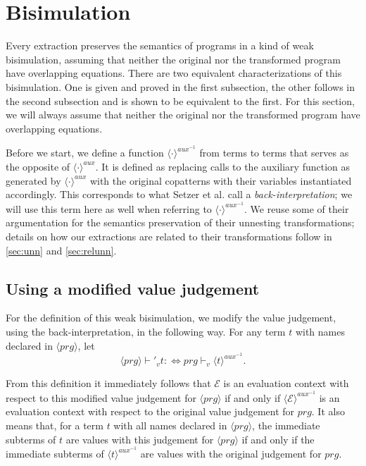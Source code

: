 \section{Bisimulation}
\label{sec:extrbis}

Every extraction preserves the semantics of programs in a kind of weak bisimulation, assuming that neither the original nor the transformed program have overlapping equations. There are two equivalent characterizations of this bisimulation. One is given and proved in the first subsection, the other follows in the second subsection and is shown to be equivalent to the first. For this section, we will always assume that neither the original nor the transformed program have overlapping equations.

Before we start, we define a function $\langle \cdot \rangle^{aux^{-1}}$ from terms to terms that serves as the opposite of $\langle \cdot \rangle^{aux}$. It is defined as replacing calls to the auxiliary function as generated by $\langle \cdot \rangle^{aux}$ with the original copatterns with their variables instantiated accordingly. This corresponds to what Setzer et al.\cite{setzer14unnesting} call a \textit{back-interpretation}; we will use this term here as well when referring to $\langle \cdot \rangle^{aux^{-1}}$. We reuse some of their argumentation for the semantics preservation of their unnesting transformations; details on how our extractions are related to their transformations follow in \autoref{sec:unn} and \autoref{sec:relunn}.

\subsection{Using a modified value judgement}

For the definition of this weak bisimulation, we modify the value judgement, using the back-interpretation, in the following way. For any term $t$ with names declared in $\langle prg \rangle$, let
\[
\langle prg \rangle \vdash'_v t :\iff prg \vdash_v \langle t \rangle^{aux^{-1}}.
\]

From this definition it immediately follows that $\mathcal{E}$ is an evaluation context with respect to this modified value judgement for $\langle prg \rangle$ if and only if $\langle \mathcal{E} \rangle^{aux^{-1}}$ is an evaluation context with respect to the original value judgement for $prg$. It also means that, for a term $t$ with all names declared in $\langle prg \rangle$, the immediate subterms of $t$ are values with this judgement for $\langle prg \rangle$ if and only if the immediate subterms of $\langle t \rangle^{aux^{-1}}$ are values with the original judgement for $prg$.

